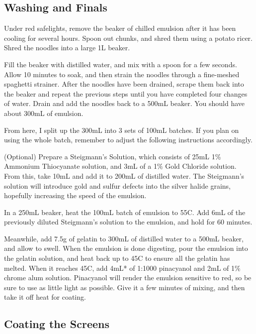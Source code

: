 \documentclass[11pt]{article}
\begin{document}
\subsection{Washing and Finals}

Under red safelights, remove the beaker of chilled emulsion after it has been cooling for several hours. Spoon out chunks, and shred them using a potato ricer. Shred the noodles into a large 1L beaker.\newline

Fill the beaker with distilled water, and mix with a spoon for a few seconds. Allow 10 minutes to soak, and then strain the noodles through a fine-meshed spaghetti strainer. After the noodles have been drained, scrape them back into the beaker and repeat the previous steps until you have completed four changes of water. Drain and add the noodles back to a 500mL beaker. You should have about 300mL of emulsion.\newline

From here, I split up the 300mL into 3 sets of 100mL batches. If you plan on using the whole batch, remember to adjust the following instructions accordingly.\newline

(Optional) Prepare a Steigmann's Solution, which consists of 25mL 1\% Ammonium Thiocyanate solution, and 3mL of a 1\% Gold Chloride solution. From this, take 10mL and add it to 200mL of distilled water. The Steigmann's solution will introduce gold and sulfur defects into the silver halide grains, hopefully increasing the speed of the emulsion.\newline 

In a 250mL beaker, heat the 100mL batch of emulsion to 55C. Add 6mL of the previously diluted Steigmann's solution to the emulsion, and hold for 60 minutes.\newline

Meanwhile, add 7.5g of gelatin to 300mL of distilled water to a 500mL beaker, and allow to swell. When the emulsion is done digesting, pour the emulsion into the gelatin solution, and heat back up to 45C to ensure all the gelatin has melted. When it reaches 45C, add 4mL* of 1:1000 pinacyanol and 2mL of 1\% chrome alum solution. Pinacyanol will render the emulsion sensitive to red, so be sure to use as little light as possible. Give it a few minutes of mixing, and then take it off heat for coating.\newline

\subsection{Coating the Screens}
\end{document}

